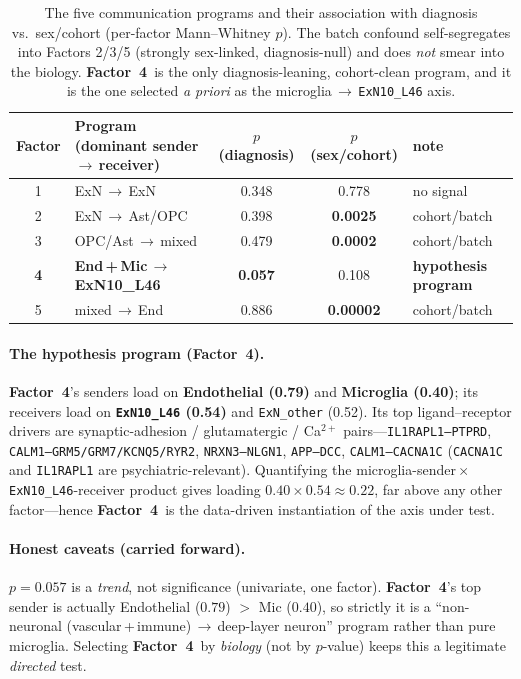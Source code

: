 \documentclass[11pt]{article}
\newcommand{\factorfour}{\textbf{Factor~4}}
\newcommand{\code}[1]{\texttt{\small #1}}
\begin{document}
\begin{table}[h]
\centering
\caption{The five communication programs and their association with diagnosis
vs.\ sex/cohort (per-factor Mann--Whitney $p$). The batch confound
self-segregates into Factors 2/3/5 (strongly sex-linked, diagnosis-null) and
does \emph{not} smear into the biology. \factorfour\ is the only
diagnosis-leaning, cohort-clean program, and it is the one selected
\emph{a priori} as the microglia\,$\rightarrow$\,\code{ExN10\_L46} axis.}
\label{tab:factors}
\small
\begin{tabular}{clccl}
\toprule
Factor & Program (dominant sender\,$\rightarrow$\,receiver) & $p$(diagnosis) &
$p$(sex/cohort) & note \\
\midrule
1 & ExN\,$\rightarrow$\,ExN & 0.348 & 0.778 & no signal \\
2 & ExN\,$\rightarrow$\,Ast/OPC & 0.398 & \textbf{0.0025} & cohort/batch \\
3 & OPC/Ast\,$\rightarrow$\,mixed & 0.479 & \textbf{0.0002} & cohort/batch \\
\rowcolor{phaseC!8}
\textbf{4} & \textbf{End\,+\,Mic\,$\rightarrow$\,ExN10\_L46} &
\textbf{0.057} & 0.108 & \textbf{hypothesis program} \\
5 & mixed\,$\rightarrow$\,End & 0.886 & \textbf{0.00002} & cohort/batch \\
\bottomrule
\end{tabular}
\end{table}

\paragraph{The hypothesis program (\factorfour).} \factorfour's senders load on
\textbf{Endothelial (0.79)} and \textbf{Microglia (0.40)}; its receivers load on
\textbf{\code{ExN10\_L46} (0.54)} and \code{ExN\_other} (0.52). Its top
ligand--receptor drivers are synaptic-adhesion / glutamatergic / Ca$^{2+}$
pairs---\code{IL1RAPL1--PTPRD}, \code{CALM1--GRM5/GRM7/KCNQ5/RYR2},
\code{NRXN3--NLGN1}, \code{APP--DCC}, \code{CALM1--CACNA1C}
(\code{CACNA1C} and \code{IL1RAPL1} are psychiatric-relevant). Quantifying the
microglia-sender\,$\times$\,\code{ExN10\_L46}-receiver product gives loading
$0.40\times0.54\approx0.22$, far above any other factor---hence \factorfour\ is
the data-driven instantiation of the axis under test.

\paragraph{Honest caveats (carried forward).} $p=0.057$ is a \emph{trend}, not
significance (univariate, one factor). \factorfour's top sender is actually
Endothelial ($0.79$) $>$ Mic ($0.40$), so strictly it is a ``non-neuronal
(vascular\,+\,immune)\,$\rightarrow$\,deep-layer neuron'' program rather than pure
microglia. Selecting \factorfour\ by \emph{biology} (not by $p$-value) keeps
this a legitimate \emph{directed} test.
\end{document}
